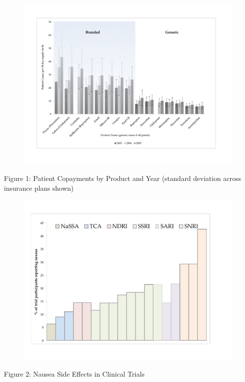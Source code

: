 \documentclass[xcolor=pdftex,dvipsnames,table,mathserif,aspectratio=169]{beamer}
\begin{document}

\begin{frame}[plain]

\begin{figure}[h!]
\centering\includegraphics[width=0.7\linewidth]{./resources/fig1.pdf}
\end{figure}

Figure 1: Patient Copayments by Product and Year (standard deviation across
insurance plans shown)
\end{frame}


\begin{frame}[plain]

\begin{figure}[h!]
\centering\includegraphics[width=0.7\linewidth]{./resources/nausea_fig.pdf}
\end{figure}

Figure 2: Nausea Side Effects in Clinical Trials
\end{frame}
\end{document}
